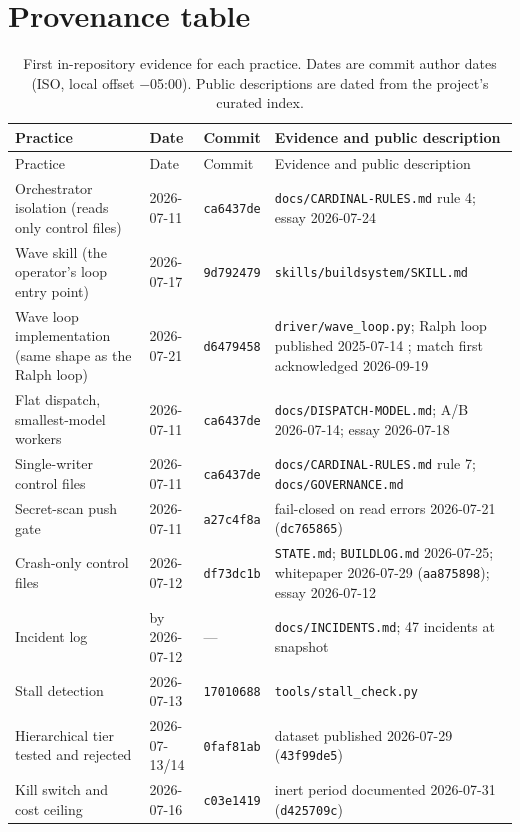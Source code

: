 \documentclass[11pt]{article}
\newcommand{\sha}[1]{\texttt{\small #1}}
\newcommand{\file}[1]{\texttt{\small #1}}
\begin{document}
\appendix
\section{Provenance table}

\begin{longtable}{P{3.6cm}P{2.3cm}P{2.3cm}P{6.2cm}}
\caption{First in-repository evidence for each practice. Dates are commit author dates (ISO, local offset $-$05:00). Public descriptions are dated from the project's curated index.}\label{tab:provenance}\\
\toprule
Practice & Date & Commit & Evidence and public description \\
\midrule
\endfirsthead
\toprule
Practice & Date & Commit & Evidence and public description \\
\midrule
\endhead
Orchestrator isolation (reads only control files) & 2026-07-11 & \sha{ca6437de} & \file{docs/CARDINAL-RULES.md} rule 4; essay 2026-07-24 \cite{unix} \\
Wave skill (the operator's loop entry point) & 2026-07-17 & \sha{9d792479} & \file{skills/buildsystem/SKILL.md} \\
Wave loop implementation (same shape as the Ralph loop) & 2026-07-21 & \sha{d6479458} & \file{driver/wave\_loop.py}; Ralph loop published 2025-07-14 \cite{huntley2025}; match first acknowledged 2026-09-19 \cite{nothingnew} \\
Flat dispatch, smallest-model workers & 2026-07-11 & \sha{ca6437de} & \file{docs/DISPATCH-MODEL.md}; A/B 2026-07-14; essay 2026-07-18 \cite{haiku} \\
Single-writer control files & 2026-07-11 & \sha{ca6437de} & \file{docs/CARDINAL-RULES.md} rule 7; \file{docs/GOVERNANCE.md} \\
Secret-scan push gate & 2026-07-11 & \sha{a27c4f8a} & fail-closed on read errors 2026-07-21 (\sha{dc765865}) \\
Crash-only control files & 2026-07-12 & \sha{df73dc1b} & \file{STATE.md}; \file{BUILDLOG.md} 2026-07-25; whitepaper 2026-07-29 (\sha{aa875898}); essay 2026-07-12 \cite{hypothesis} \\
Incident log & by 2026-07-12 & --- & \file{docs/INCIDENTS.md}; 47 incidents at snapshot \\
Stall detection & 2026-07-13 & \sha{17010688} & \file{tools/stall\_check.py} \\
Hierarchical tier tested and rejected & 2026-07-13/14 & \sha{0faf81ab} & dataset published 2026-07-29 (\sha{43f99de5}) \\
Kill switch and cost ceiling & 2026-07-16 & \sha{c03e1419} & inert period documented 2026-07-31 (\sha{d425709c}) \\

\end{longtable}
\end{document}
